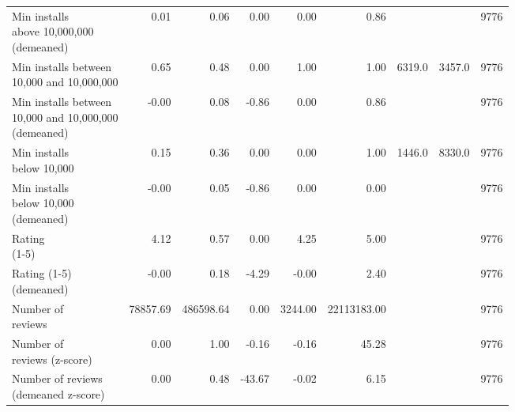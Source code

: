 \begin{table}[h!]
\begin{tabular}{lrrrrrrrr}
\makecell[l]{Min installs \\ above 10,000,000 \\ (demeaned)}              &  0.01 &  0.06 &  0.00 &  0.00 &  0.86 & {} & {} &  9776 \\
\makecell[l]{Min installs between \\ 10,000 and 10,000,000}               &  0.65 &  0.48 &  0.00 &  1.00 &  1.00 &  6319.0 &  3457.0 &  9776 \\
\makecell[l]{Min installs between \\ 10,000 and 10,000,000 \\ (demeaned)} & -0.00 &  0.08 & -0.86 &  0.00 &  0.86 & {} & {} &  9776 \\
\makecell[l]{Min installs \\ below 10,000}                                &  0.15 &  0.36 &  0.00 &  0.00 &  1.00 &  1446.0 &  8330.0 &  9776 \\
\makecell[l]{Min installs \\ below 10,000 \\ (demeaned)}                  & -0.00 &  0.05 & -0.86 &  0.00 &  0.00 & {} & {} &  9776 \\
\makecell[l]{Rating \\ (1-5)}                                             &  4.12 &  0.57 &  0.00 &  4.25 &  5.00 & {} & {} &  9776 \\
\makecell[l]{Rating (1-5) \\ (demeaned)}                                  & -0.00 &  0.18 & -4.29 & -0.00 &  2.40 & {} & {} &  9776 \\
\makecell[l]{Number of \\ reviews}                                        &  78857.69 &  486598.64 &  0.00 &  3244.00 &  22113183.00 & {} & {} &  9776 \\
\makecell[l]{Number of \\ reviews (z-score)}                              &  0.00 &  1.00 & -0.16 & -0.16 &  45.28 & {} & {} &  9776 \\
\makecell[l]{Number of reviews \\ (demeaned z-score)}                     &  0.00 &  0.48 & -43.67 & -0.02 &  6.15 & {} & {} &  9776 \\
\bottomrule
\end{tabular}
\end{table}
